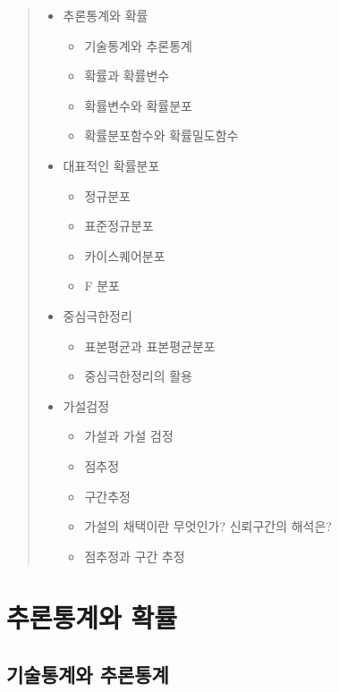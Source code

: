 \documentclass[
]{book}
\providecommand{\tightlist}{%
  \setlength{\itemsep}{0pt}\setlength{\parskip}{0pt}}
\begin{document}
\begin{quote}
\begin{itemize}
\tightlist
\item
  추론통계와 확률

  \begin{itemize}
  \tightlist
  \item
    기술통계와 추론통계
  \item
    확률과 확률변수
  \item
    확률변수와 확률분포
  \item
    확률분포함수와 확률밀도함수
  \end{itemize}
\item
  대표적인 확률분포

  \begin{itemize}
  \tightlist
  \item
    정규분포
  \item
    표준정규분포
  \item
    카이스퀘어분포
  \item
    F 분포
  \end{itemize}
\item
  중심극한정리

  \begin{itemize}
  \tightlist
  \item
    표본평균과 표본평균분포
  \item
    중심극한정리의 활용
  \end{itemize}
\item
  가설검정

  \begin{itemize}
  \tightlist
  \item
    가설과 가설 검정
  \item
    점추정
  \item
    구간추정
  \item
    가설의 채택이란 무엇인가? 신뢰구간의 해석은?
  \item
    점추정과 구간 추정
  \end{itemize}
\end{itemize}
\end{quote}

\section{추론통계와 확률}\label{uxcd94uxb860uxd1b5uxacc4uxc640-uxd655uxb960}

\subsection{기술통계와 추론통계}\label{uxae30uxc220uxd1b5uxacc4uxc640-uxcd94uxb860uxd1b5uxacc4}
\end{document}

